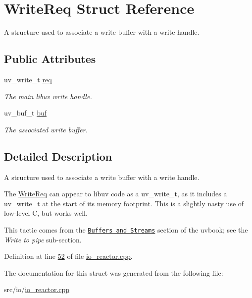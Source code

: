 \hypertarget{structWriteReq}{\section{Write\+Req Struct Reference}
\label{structWriteReq}
}


A structure used to associate a write buffer with a write handle.  


\subsection*{Public Attributes}
\begin{DoxyCompactItemize}
\item 
\hypertarget{structWriteReq_a1ce5132e8813190d079864301a54090e}{uv\+\_\+write\+\_\+t \hyperlink{structWriteReq_a1ce5132e8813190d079864301a54090e}{req}}\label{structWriteReq_a1ce5132e8813190d079864301a54090e}

\begin{DoxyCompactList}\small\item\em The main libuv write handle. \end{DoxyCompactList}\item 
\hypertarget{structWriteReq_a2e611e010ab154c56c8055dee140b6b5}{uv\+\_\+buf\+\_\+t \hyperlink{structWriteReq_a2e611e010ab154c56c8055dee140b6b5}{buf}}\label{structWriteReq_a2e611e010ab154c56c8055dee140b6b5}

\begin{DoxyCompactList}\small\item\em The associated write buffer. \end{DoxyCompactList}\end{DoxyCompactItemize}


\subsection{Detailed Description}
A structure used to associate a write buffer with a write handle. 

The \hyperlink{structWriteReq}{Write\+Req} can appear to libuv code as a {\ttfamily uv\+\_\+write\+\_\+t}, as it includes a {\ttfamily uv\+\_\+write\+\_\+t} at the start of its memory footprint. This is a slightly nasty use of low-\/level C, but works well.

This tactic comes from the \href{https://nikhilm.github.io/uvbook/filesystem.html#buffers-and-streams}{\tt Buffers and Streams} section of the uvbook; see the {\itshape Write to pipe} sub-\/section. 

Definition at line \hyperlink{io__reactor_8cpp_source_l00052}{52} of file \hyperlink{io__reactor_8cpp_source}{io\+\_\+reactor.\+cpp}.



The documentation for this struct was generated from the following file\+:\begin{DoxyCompactItemize}
\item 
src/io/\hyperlink{io__reactor_8cpp}{io\+\_\+reactor.\+cpp}\end{DoxyCompactItemize}
